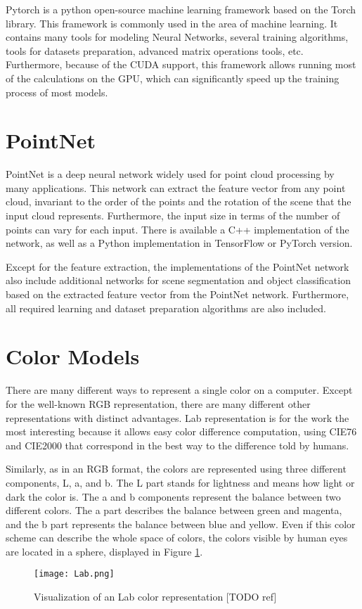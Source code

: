 Pytorch \cite{PyTorch} is a python open-source machine learning framework based on the Torch library. This framework is commonly used in the area of machine learning. It contains many tools for modeling Neural Networks, several training algorithms, tools for datasets preparation, advanced matrix operations tools, etc. Furthermore, because of the CUDA support, this framework allows running most of the calculations on the GPU, which can significantly speed up the training process of most models.

\section{PointNet}\label{section:pointNet}

PointNet \cite{PointNet} is a deep neural network widely used for point cloud processing by many applications. This network can extract the feature vector from any point cloud, invariant to the order of the points and the rotation of the scene that the input cloud represents. Furthermore, the input size in terms of the number of points can vary for each input. There is available a C++ implementation \cite{PNCpp} of the network, as well as a Python implementation in TensorFlow \cite{PNPython} or PyTorch \cite{PNTorch} version.\par
Except for the feature extraction, the implementations of the PointNet network also include additional networks for scene segmentation and object classification based on the extracted feature vector from the PointNet network. Furthermore, all required learning and dataset preparation algorithms are also included.

\section{Color Models}\label{section:colorModels}

There are many different ways to represent a single color on a computer. Except for the well-known RGB representation, there are many different other representations with distinct advantages. Lab \cite{Lab} representation is for the work the most interesting because it allows easy color difference computation, using CIE76 and CIE2000 \cite{CIEs} that correspond in the best way to the difference told by humans.\par
Similarly, as in an RGB format, the colors are represented using three different components, L, a, and b. The L part stands for lightness and means how light or dark the color is. The a and b components represent the balance between two different colors. The a part describes the balance between green and magenta, and the b part represents the balance between blue and yellow. Even if this color scheme can describe the whole space of colors, the colors visible by human eyes are located in a sphere, displayed in Figure \ref{fig:labscheme}.

\begin{figure}[htpb]
    \centering
    \texttt{[image: Lab.png]}
    \caption{Visualization of an Lab color representation [TODO ref]} \label{fig:labscheme}
\end{figure}
